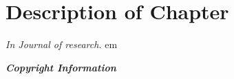 \cleartoverso
\backgroundtrue
\cleartorecto

\chapter{Description of Chapter}

\vfill
\begin{flushright}
  {\Large \textit{In Journal of research.}}
   em
  {\LARGE \theauthor}\\
\end{flushright}

\clearpage
\backgroundfalse


\begin{boxabstract}
  \blindtext
\end{boxabstract}

\par\vspace*{\fill}
{\itshape\footnotesize\noindent\textbf{Copyright Information}}\\

\clearpage